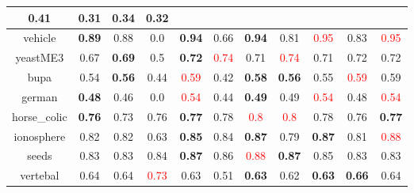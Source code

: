 \documentclass{article}%
\begin{document}
\begin{tabular}{c|cccccccccc}
{0.41
}&0.31&\textbf{0.34}&0.32\\%
\hline%
vehicle&\textbf{0.89}&0.88&0.0&\textbf{0.94}&0.66&\textbf{0.94}&0.81&\textcolor{red}{ 
0.95
}&0.83&\textcolor{red}{ 
0.95
}\\%
\hline%
yeastME3&0.67&\textbf{0.69}&0.5&\textbf{0.72}&\textcolor{red}{ 
0.74
}&0.71&\textcolor{red}{ 
0.74
}&0.71&0.72&0.72\\%
\hline%
bupa&0.54&\textbf{0.56}&0.44&\textcolor{red}{ 
0.59
}&0.42&\textbf{0.58}&\textbf{0.56}&0.55&\textcolor{red}{ 
0.59
}&0.59\\%
\hline%
german&\textbf{0.48}&0.46&0.0&\textcolor{red}{ 
0.54
}&0.44&\textbf{0.49}&0.49&\textcolor{red}{ 
0.54
}&0.48&\textcolor{red}{ 
0.54
}\\%
\hline%
horse\_colic&\textbf{0.76}&0.73&0.76&\textbf{0.77}&0.78&\textcolor{red}{ 
0.8
}&\textcolor{red}{ 
0.8
}&0.78&0.76&\textbf{0.77}\\%
\hline%
ionosphere&0.82&0.82&0.63&\textbf{0.85}&0.84&\textbf{0.87}&0.79&\textbf{0.87}&0.81&\textcolor{red}{ 
0.88
}\\%
\hline%
seeds&0.83&0.83&0.84&\textbf{0.87}&0.86&\textcolor{red}{ 
0.88
}&\textbf{0.87}&0.85&0.83&0.83\\%
\hline%
vertebal&0.64&0.64&\textcolor{red}{ 
0.73
}&0.63&0.51&\textbf{0.63}&0.62&\textbf{0.63}&\textbf{0.66}&0.64\\%
\hline%
\end{tabular}

%
\end{document}
